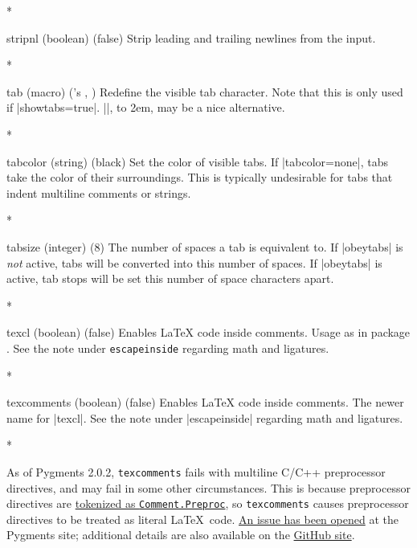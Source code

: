 \begin{paracol}{2}
\begin{optionlist}
\switchcolumn[0]*%
  \item[stripnl (boolean) (false)]
    Strip leading and trailing newlines from the input.

    \switchcolumn

    \switchcolumn[0]*%
\item[tab (macro) ({\rmfamily\pkg{fancyvrb}'s} \string\FancyVerbTab, \FancyVerbTab)]
Redefine the visible tab character.  Note that this is only used if |showtabs=true|.  |\rightarrowfill|, \hbox to 2em{\rightarrowfill}, may be a nice alternative.
\switchcolumn

\switchcolumn[0]*%

\item[tabcolor (string) (black)]
Set the color of visible tabs.  If |tabcolor=none|, tabs take the color of their surroundings.  This is typically undesirable for tabs that indent multiline comments or strings.
\switchcolumn

\switchcolumn[0]*%

  \item[tabsize (integer) (8)]
    The number of spaces a tab is equivalent to.  If |obeytabs| is \emph{not} active, tabs will be converted into this number of spaces.  If |obeytabs| is active, tab stops will be set this number of space characters apart.
    \switchcolumn

\switchcolumn[0]*%
  \item[texcl (boolean) (false)]
    Enables \LaTeX{} code inside comments.
    Usage as in package .  See the note under \texttt{escapeinside} regarding math and ligatures.
    \switchcolumn

\switchcolumn[0]*%
  \item[texcomments (boolean) (false)]
    Enables \LaTeX{} code inside comments.  The newer name for |texcl|.  See the note under |escapeinside| regarding math and ligatures.
    \switchcolumn

\switchcolumn[0]*%

    As of Pygments 2.0.2, \texttt{texcomments} fails with multiline C/C++ preprocessor directives, and may fail in some other circumstances.  This is because preprocessor directives are \href{http://pygments.org/docs/tokens/}{tokenized as \texttt{Comment.Preproc}}, so \texttt{texcomments} causes preprocessor directives to be treated as literal \LaTeX\ code.  \href{https://bitbucket.org/birkenfeld/pygments-main/issue/1086/wrong-processing-of-in-c-c-macros-if-is}{An issue has been opened} at the Pygments site; additional details are also available on the \href{https://github.com/gpoore/minted/issues/66}{ GitHub site}.
    \switchcolumn


\end{optionlist}
\end{paracol}
